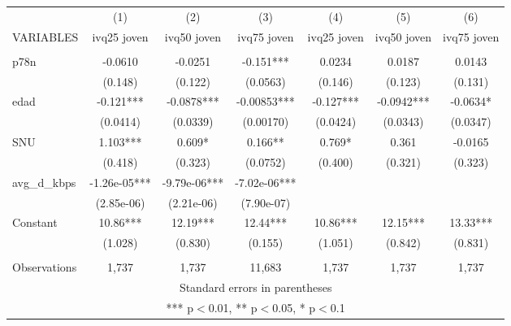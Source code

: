 \begin{tabular}{lcccccc} \hline
 & (1) & (2) & (3) & (4) & (5) & (6) \\
VARIABLES & ivq25 joven & ivq50 joven & ivq75 joven & ivq25 joven & ivq50 joven & ivq75 joven \\ \hline
 &  &  &  &  &  &  \\
p78n & -0.0610 & -0.0251 & -0.151*** & 0.0234 & 0.0187 & 0.0143 \\
 & (0.148) & (0.122) & (0.0563) & (0.146) & (0.123) & (0.131) \\
edad & -0.121*** & -0.0878*** & -0.00853*** & -0.127*** & -0.0942*** & -0.0634* \\
 & (0.0414) & (0.0339) & (0.00170) & (0.0424) & (0.0343) & (0.0347) \\
SNU & 1.103*** & 0.609* & 0.166** & 0.769* & 0.361 & -0.0165 \\
 & (0.418) & (0.323) & (0.0752) & (0.400) & (0.321) & (0.323) \\
avg\_d\_kbps & -1.26e-05*** & -9.79e-06*** & -7.02e-06*** &  &  &  \\
 & (2.85e-06) & (2.21e-06) & (7.90e-07) &  &  &  \\
Constant & 10.86*** & 12.19*** & 12.44*** & 10.86*** & 12.15*** & 13.33*** \\
 & (1.028) & (0.830) & (0.155) & (1.051) & (0.842) & (0.831) \\
 &  &  &  &  &  &  \\
 Observations & 1,737 & 1,737 & 11,683 & 1,737 & 1,737 & 1,737 \\ \hline
\multicolumn{7}{c}{ Standard errors in parentheses} \\
\multicolumn{7}{c}{ *** p$<$0.01, ** p$<$0.05, * p$<$0.1} \\
\end{tabular}
